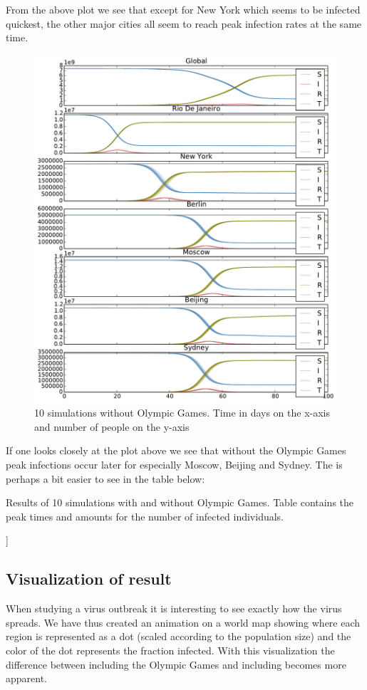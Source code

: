 From the above plot we see that except for New York which seems to be infected quickest, the other major cities all seem to reach peak infection rates at the same time. 

\begin{figure}[H]
	\centering
	\includegraphics[width=1.0 \linewidth]{plots/no_rio.pdf}
	\caption{10 simulations without Olympic Games. Time in days on the x-axis and number of people on the y-axis}
\end{figure}

If one looks closely at the plot above we see that without the Olympic Games peak infections occur later for especially Moscow, Beijing and Sydney. The is perhaps a bit easier to see in the table below:

\begin{table}[H]
	\centering
	
	\caption{Results of 10 simulations with and without Olympic Games. Table contains the peak times and amounts for the number of infected individuals.}
\end{table}]


\subsection{Visualization of result}
When studying a virus outbreak it is interesting to see exactly how the virus spreads. We have thus created an animation on a world map showing where each region is represented as a dot (scaled according to the population size) and the color of the dot represents the fraction infected. With this visualization the difference between including the Olympic Games and including becomes more apparent.

